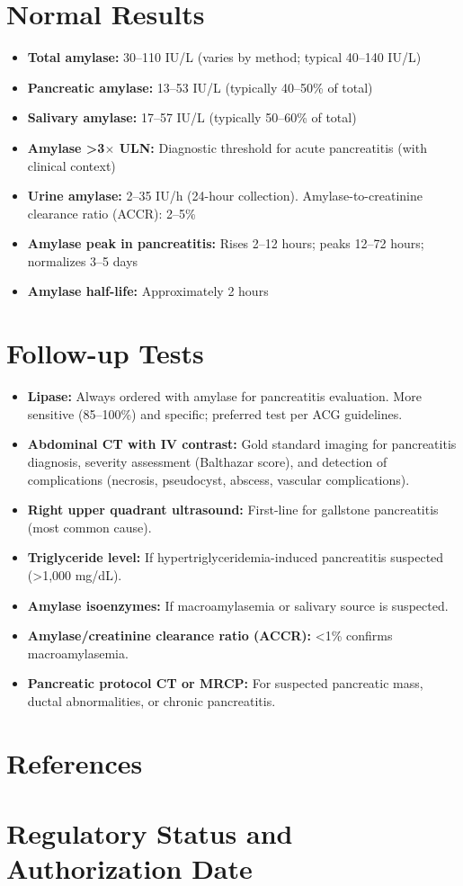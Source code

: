 \section*{Normal Results}
\begin{itemize}
  \item \textbf{Total amylase:} 30--110 IU/L (varies by method; typical 40--140 IU/L)
  \item \textbf{Pancreatic amylase:} 13--53 IU/L (typically 40--50\% of total)
  \item \textbf{Salivary amylase:} 17--57 IU/L (typically 50--60\% of total)
  \item \textbf{Amylase >3$\times$ ULN:} Diagnostic threshold for acute pancreatitis (with clinical context)
  \item \textbf{Urine amylase:} 2--35 IU/h (24-hour collection). Amylase-to-creatinine clearance ratio (ACCR): 2--5\%
  \item \textbf{Amylase peak in pancreatitis:} Rises 2--12 hours; peaks 12--72 hours; normalizes 3--5 days
  \item \textbf{Amylase half-life:} Approximately 2 hours
\end{itemize}

\section*{Follow-up Tests}
\begin{itemize}
  \item \textbf{Lipase:} Always ordered with amylase for pancreatitis evaluation. More sensitive (85--100\%) and specific; preferred test per ACG guidelines.
  \item \textbf{Abdominal CT with IV contrast:} Gold standard imaging for pancreatitis diagnosis, severity assessment (Balthazar score), and detection of complications (necrosis, pseudocyst, abscess, vascular complications).
  \item \textbf{Right upper quadrant ultrasound:} First-line for gallstone pancreatitis (most common cause).
  \item \textbf{Triglyceride level:} If hypertriglyceridemia-induced pancreatitis suspected (>1,000 mg/dL).
  \item \textbf{Amylase isoenzymes:} If macroamylasemia or salivary source is suspected.
  \item \textbf{Amylase/creatinine clearance ratio (ACCR):} <1\% confirms macroamylasemia.
  \item \textbf{Pancreatic protocol CT or MRCP:} For suspected pancreatic mass, ductal abnormalities, or chronic pancreatitis.
\end{itemize}

\section*{References}



\clearpage
\section*{Regulatory Status and Authorization Date}

\clearpage
